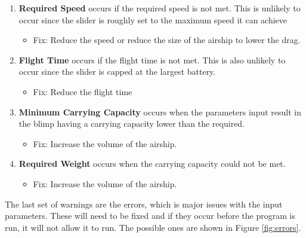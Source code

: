 \documentclass[../main.tex]{subfiles}
\begin{document}
\begin{enumerate}
	\item \textbf{Required Speed} occurs if the required speed is not met. This is unlikely to occur since the slider is roughly set to the maximum speed it can achieve
	\begin{itemize}
		\item Fix: Reduce the speed or reduce the size of the airship to lower the drag.
	\end{itemize}
	\item \textbf{Flight Time} occurs if the flight time is not met. This is also unlikely to occur since the slider is capped at the largest battery.
	\begin{itemize}
		\item Fix: Reduce the flight time
	\end{itemize} 
	\item \textbf{Minimum Carrying Capacity} occurs when the parameters input result in the blimp having a carrying capacity lower than the required.
	\begin{itemize}
		\item Fix: Increase the volume of the airship.
	\end{itemize} 
	\item \textbf{Required Weight} occurs when the carrying capacity could not be met.
	\begin{itemize}
		\item Fix: Increase the volume of the airship.
	\end{itemize} 
\end{enumerate}

The last set of warnings are the errors, which is major issues with the input parameters. These will need to be fixed and if they occur before the program is run, it will not allow it to run. The possible ones are shown in Figure \ref{fig:errors}.
\end{document}
